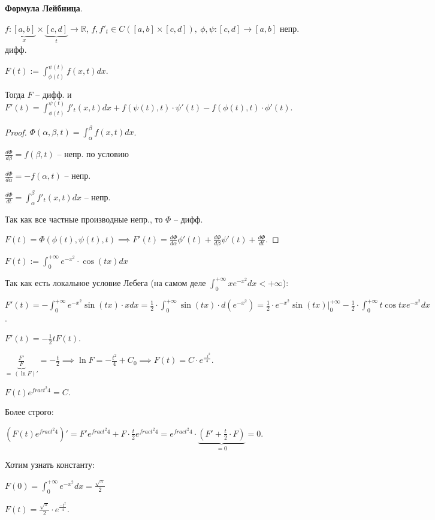 \begin{theorem}
    \textbf{Формула Лейбница}.

    $f: \underbrace{[a, b]}_{x} \times \underbrace{[c, d]}_{t} \rightarrow \mathbb{R}$, $f, f'_t \in C([a, b] \times [c, d]), \ \phi, \psi : [c, d] \rightarrow [a, b]$ непр. дифф.

    $F(t) := \int_{\phi(t)}^{\psi(t)} { f(x, t) d x }$.

    Тогда $F$ -- дифф. и $F'(t) = \int_{\phi(t)}^{\psi(t)} { f'_t (x, t) dx } + f (\psi(t), t) \cdot \psi'(t) - f(\phi(t), t) \cdot \phi'(t)$.
\end{theorem}
\begin{proof}
    $\Phi(\alpha, \beta, t) = \int_{\alpha}^{\beta} {f(x, t) d x}$.

    $\frac{d\Phi}{d \beta} = f(\beta, t)$ -- непр. по условию
    
    $\frac{d\Phi}{d \alpha} = -f(\alpha, t)$ -- непр.

    $\frac{d \Phi}{d t} = \int_{\alpha}^{\beta} {f'_t (x, t) d x}$ -- непр.

    Так как все частные производные непр., то $\Phi$ -- дифф.

    $F(t) = \Phi(\phi(t), \psi(t), t) \implies F'(t) = \frac{d \Phi}{d \alpha} \phi'(t) + \frac{d \Phi}{d \beta} \psi'(t) + \frac{d\Phi}{dt}$.
\end{proof}

\begin{example}
    $F(t) := \int_{0}^{+\infty} {e^{-x^2} \cdot \cos(tx) dx}$

    Так как есть локальное условие Лебега (на самом деле $\int_{0}^{+\infty} { x e^{-x^2} d x } < +\infty$):

    $F'(t) = -\int_{0}^{+\infty} { e^{-x^2} \sin(tx) \cdot x dx } = \frac{1}{2} \cdot \int_{0}^{+\infty} { \sin(tx) \cdot d (e^{-x^2}) } = \frac{1}{2} \cdot e^{-x^2} \sin(tx) |_{0}^{+\infty} - \frac{1}{2} \cdot \int_{0}^{+\infty} { t \cos{tx} e^{-x^2} dx }$.

    $F'(t) = -\frac{1}{2} t F(t)$.
    
    $\underbrace{\frac{F'}{F}}_{= \ (\ln{F})'} = -\frac{t}{2} \implies \ln{F} = -\frac{t^2}{4} + C_0 \implies F(t) = C \cdot e^{\frac{-t^2}{4}}$.

    $F(t) e^{frac{t^2}{4}} = C$.

    Более строго:

    $\left( F(t) e^{frac{t^2}{4}} \right)' = F' e^{frac{t^2}{4}} + F \cdot \frac{t}{2} e^{frac{t^2}{4}} = e^{frac{t^2}{4}} \cdot \underbrace{(F' + \frac{t}{2} \cdot F)}_{= 0} = 0$.

    Хотим узнать константу:

    $F(0) = \int_{0}^{+\infty} { e^{-x^2} dx } = \frac{\sqrt{\pi}}{2}$

    $F(t) = \frac{\sqrt{\pi}}{2} \cdot e^{\frac{-t^2}{4}}$.
\end{example}



